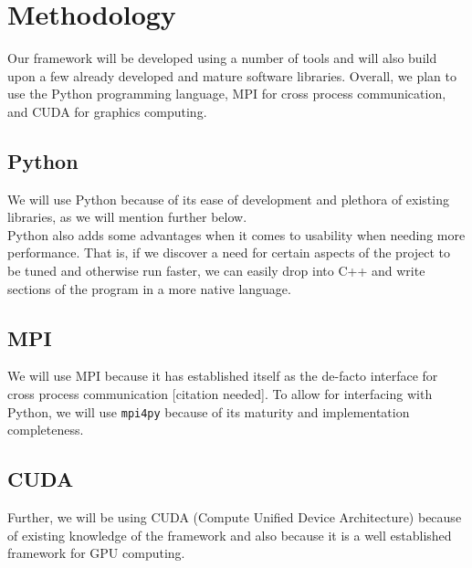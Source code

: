 \section{Methodology}

Our framework will be developed using a number of tools and will also build
upon a few already developed and mature software libraries. Overall, we plan to
use the Python programming language, MPI for cross process communication, and
CUDA for graphics computing.

\subsection{Python}

We will use Python because of its ease of development and plethora of existing
libraries, as we will mention further below.\\

Python also adds some advantages when it comes to usability when needing more
performance. That is, if we discover a need for certain aspects of the project
to be tuned and otherwise run faster, we can easily drop into C++ and write
sections of the program in a more native language.

\subsection{MPI}

We will use MPI because it has established itself as the de-facto interface for
cross process communication [citation needed]. To allow for interfacing with
Python, we will use \texttt{mpi4py} because of its maturity and implementation
completeness.

\subsection{CUDA}

Further, we will be using CUDA (Compute Unified Device Architecture) because of
existing knowledge of the framework and also because it is a well established
framework for GPU computing.
